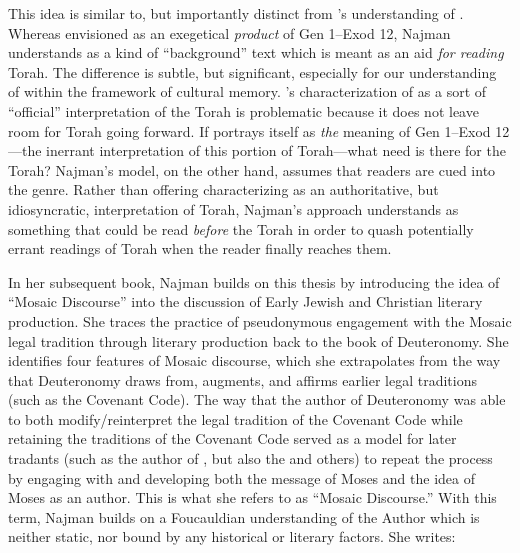 This idea is similar to, but importantly distinct from \vanderkam's understanding of \jub. Whereas \vanderkam envisioned \jub as an exegetical \emph{product} of Gen 1--Exod 12, Najman understands \jub as a kind of ``background'' text which is meant as an aid \emph{for reading} Torah. The difference is subtle, but significant, especially for our understanding of \jub within the framework of cultural memory. \vanderkam's characterization of \jub as a sort of ``official'' interpretation of the Torah is problematic because it does not leave room for Torah going forward. If \jub portrays itself as \emph{the} meaning of Gen 1--Exod 12---the inerrant interpretation of this portion of Torah---what need is there for the Torah? Najman's model, on the other hand, assumes that readers are cued into the genre. Rather than offering characterizing \jub as an authoritative, but idiosyncratic, interpretation of Torah, Najman's approach understands \jub as something that could be read \emph{before} the Torah in order to quash potentially errant readings of Torah when the reader finally reaches them.\autocite[408]{najman_jsj1999}

In her subsequent book, Najman builds on this thesis by introducing the idea of ``Mosaic Discourse'' into the discussion of Early Jewish and Christian literary production. She traces the practice of pseudonymous engagement with the Mosaic legal tradition through literary production back to the book of Deuteronomy.\autocite[48]{najman2003} She identifies four features of Mosaic discourse, which she extrapolates from the way that Deuteronomy draws from, augments, and affirms earlier legal traditions (such as the Covenant Code). The way that the author of Deuteronomy was able to both modify/reinterpret the legal tradition of the Covenant Code while retaining the traditions of the Covenant Code served as a model for later tradants (such as the author of \Jub, but also the \templesroll and others) to repeat the process by engaging with and developing both the message of Moses and the idea of Moses as an author. This is what she refers to as ``Mosaic Discourse.'' With this term, Najman builds on a Foucauldian understanding of the Author which is neither static, nor bound by any historical or literary factors. She writes:

